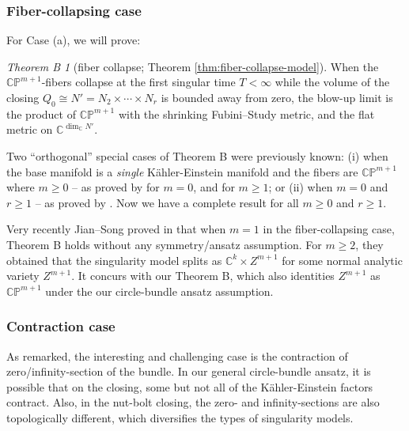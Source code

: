 \documentclass[11pt]{amsart}
\theoremstyle{plain}
\numberwithin{equation}{section}
\theoremstyle{definition}
\theoremstyle{remark}
\newtheorem*{thmB}{Theorem B}
\begin{document}
\subsubsection{Fiber-collapsing case} For Case (a), we will prove:

\begin{thmB}[fiber collapse; Theorem \ref{thm:fiber-collapse-model}]
When the $\mathbb{CP}^{m+1}$-fibers collapse at the first singular time $T < \infty$ while the volume of the closing $Q_0 \cong N' = N_2 \times \cdots \times N_r$ is bounded away from zero, the blow-up limit is the product of $\mathbb{CP}^{m+1}$ with the shrinking Fubini--Study metric, and the flat metric on $\mathbb{C}^{\dim_{\mathbb{C}}N'}$.
\end{thmB}

Two ``orthogonal'' special cases of Theorem B were previously known: (i) when the base manifold is a \emph{single} K\"ahler-Einstein manifold and the fibers are $\mathbb{CP}^{m+1}$ where $m \geq 0$ -- as proved by \cite{F} for $m = 0$, and \cite{JST} for $m \geq 1$; or (ii) when $m = 0$ and $r \geq 1$ -- as proved by \cite{FT}. Now we have a complete result for all $m \geq 0$ and $r \geq 1$.

 Very recently Jian--Song proved in \cite{JS26} that when $m = 1$ in the fiber-collapsing case, Theorem B holds without any symmetry/ansatz assumption. For $m \geq 2$, they obtained that the singularity model splits as $\mathbb{C}^k \times Z^{m+1}$ for some normal analytic variety $Z^{m+1}$. It concurs with our Theorem B, which also identities $Z^{m+1}$ as $\mathbb{CP}^{m+1}$ under the our circle-bundle ansatz assumption.

\subsubsection{Contraction case}

As remarked, the interesting and challenging case is the contraction of zero/infinity-section of the bundle. In our general circle-bundle ansatz, it is possible that on the closing, some but not all of the K\"ahler-Einstein factors contract. Also, in the nut-bolt closing, the zero- and infinity-sections are also topologically different, which diversifies the types of singularity models.
\end{document}
